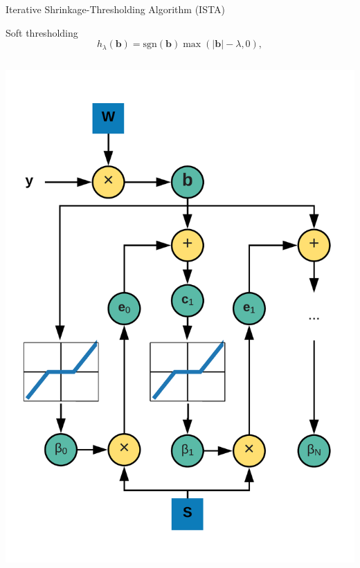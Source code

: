 \documentclass[9pt]{beamer}
\begin{document}

\begin{frame}{Iterative Shrinkage-Thresholding Algorithm (ISTA)}
\begin{block}{Soft thresholding}
\begin{equation*}
  h_\lambda(\mathbf{b}) = \text{sgn}(\mathbf{b}) \max(|\mathbf{b}| - \lambda, 0),
  \end{equation*}
\end{block}
 \begin{columns}
    \begin{column}{0.4\textwidth}
          \includegraphics[width=0.75\columnwidth]{graphics/LISTA_main.pdf}

\end{column}
\end{columns}
\end{frame}
\end{document}
